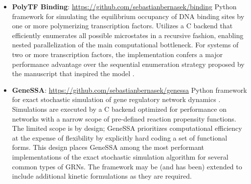 \begin{itemize}[leftmargin=*,topsep=10pt, itemsep=10pt]
  \item \textbf{PolyTF Binding}: \url{https://github.com/sebastianbernasek/binding}
  \newline 
  Python framework for simulating the equilibrium occupancy of DNA binding sites by one or more polymerizing transcription factors. Utilizes a C backend that efficiently enumerates all possible microstates in a recursive fashion, enabling nested parallelization of the main computational bottleneck. For systems of two or more transcription factors, the implementation confers a major performance advantage over the sequential enumeration strategy proposed by the manuscript that inspired the model \cite{Hope2017}.
  
  \item \textbf{GeneSSA}: \url{https://github.com/sebastianbernasek/genessa}
  \newline
  Python framework for exact stochastic simulation of gene regulatory network dynamics \cite{Gillespie1977}. Simulations are executed by a C backend optimized for performance on networks with a narrow scope of pre-defined reaction propensity functions. The limited scope is by design; GeneSSA prioritizes computational efficiency at the expense of flexibility by explicitly hard coding a set of functional forms. This design places GeneSSA among the most performant implementations of the exact stochastic simulation algorithm for several common types of GRNs. The framework may be (and has been) extended to include additional kinetic formulations as they are required.
  
\end{itemize}